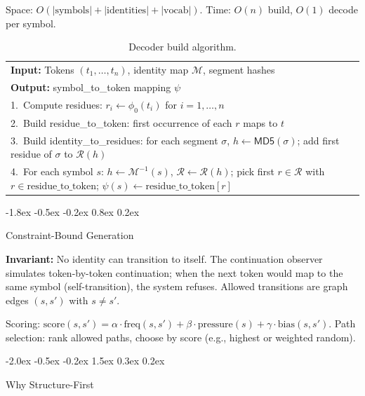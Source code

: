 \documentclass[10pt]{article}
\makeatletter
\renewcommand{\section}{\@startsection{section}{1}{\z@}%
  {-2.0ex \@plus -0.5ex \@minus -0.2ex}%
  {1.5ex \@plus 0.3ex \@minus 0.2ex}%
  {\large\bfseries\raggedright}}
\renewcommand{\subsection}{\@startsection{subsection}{2}{\z@}%
  {-1.8ex \@plus -0.5ex \@minus -0.2ex}%
  {0.8ex \@plus 0.2ex}%
  {\normalsize\bfseries\raggedright}}
\makeatother
\begin{document}
Space: $O(|\text{symbols}| + |\text{identities}| + |\text{vocab}|)$.
Time: $O(n)$ build, $O(1)$ decode per symbol.

\begin{table}[t]
\centering
\caption{Decoder build algorithm.}
\label{tab:decoder}
\begin{tabular}{l}
\toprule
\textbf{Input:} Tokens $(t_1, \ldots, t_n)$, identity map $\mathcal{M}$, segment hashes\\
\textbf{Output:} symbol\_to\_token mapping $\psi$\\
\midrule
1.~Compute residues: $r_i \gets \phi_0(t_i)$ for $i = 1, \ldots, n$\\
2.~Build residue\_to\_token: first occurrence of each $r$ maps to $t$\\
3.~Build identity\_to\_residues: for each segment $\sigma$, $h \gets \mathsf{MD5}(\sigma)$; add first residue of $\sigma$ to $\mathcal{R}(h)$\\
4.~For each symbol $s$: $h \gets \mathcal{M}^{-1}(s)$, $\mathcal{R} \gets \mathcal{R}(h)$; pick first $r \in \mathcal{R}$ with $r \in \text{residue\_to\_token}$; $\psi(s) \gets \text{residue\_to\_token}[r]$\\
\bottomrule
\end{tabular}
\end{table}

\subsection{Constraint-Bound Generation}

\textbf{Invariant:} No identity can transition to itself. The continuation observer
simulates token-by-token continuation; when the next token would map to the same
symbol (self-transition), the system refuses. Allowed transitions are graph edges
$(s, s')$ with $s \neq s'$.

Scoring:
$\text{score}(s, s') = \alpha \cdot \text{freq}(s, s') + \beta \cdot \text{pressure}(s) + \gamma \cdot \text{bias}(s, s')$.
Path selection: rank allowed paths, choose by score (e.g., highest or weighted random).

\section{Why Structure-First}
\label{sec:why}
\end{document}
